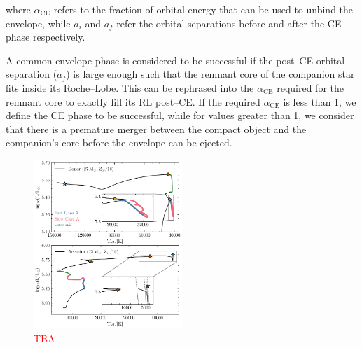 \documentclass[linenumbers,trackchanges,twocolumn]{aastex701}
\newcommand{\Mdot}{\mathrm{M}_{\odot}}
\newcommand{\red}{\textcolor{red}}
\begin{document}
where $\alpha_{\text{CE}}$ refers to the fraction of orbital energy that can be used to unbind the envelope, while $a_i$ and $a_f$ refer the orbital separations before and after the CE phase respectively.

A common envelope phase is considered to be successful if the post--CE orbital separation ($a_f$) is large enough such that the remnant core of the companion star fits inside its Roche--Lobe. This can be rephrased into the $\alpha_{\text{CE}}$ required for the remnant core to exactly fill its RL post--CE. If the required $\alpha_{\text{CE}}$ is less than 1, we define the CE phase to be successful, while for values greater than 1, we consider that there is a premature merger between the compact object and the companion's core before the envelope can be ejected.




\begin{figure}[htbp]
    \centering
    \includegraphics[width=0.5\textwidth]{gw_fiducial_hr.pdf}
    \caption{\red{TBA}}
    \label{fig:gw_hr}
\end{figure}
\end{document}

